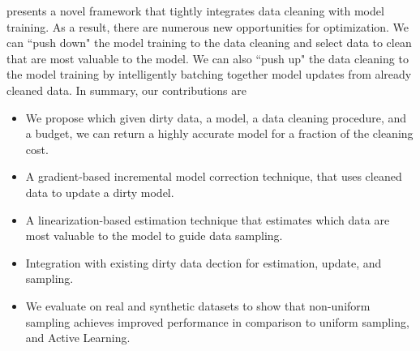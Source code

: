 \sys presents a novel framework that tightly integrates data cleaning with model training.
As a result, there are numerous new opportunities for optimization.
We can ``push down" the model training to the data cleaning and select data to clean that are most valuable to the model.
We can also ``push up" the data cleaning to the model training by intelligently batching together model updates from already cleaned data.
In summary, our contributions are
\begin{itemize}[noitemsep]
\item We propose \sysfull which given dirty data, a model, a data cleaning procedure, and a budget, we can return a highly accurate model for a fraction of the cleaning cost.
\item A gradient-based incremental model correction technique, that uses cleaned data to update a dirty model.
\item A linearization-based estimation technique that estimates which data are most valuable to the model to guide data sampling.
\item Integration with existing dirty data dection for estimation, update, and sampling.
\item We evaluate \sysfull on real and synthetic datasets to show that non-uniform sampling achieves improved performance in comparison to uniform sampling, and Active Learning.
\end{itemize}






